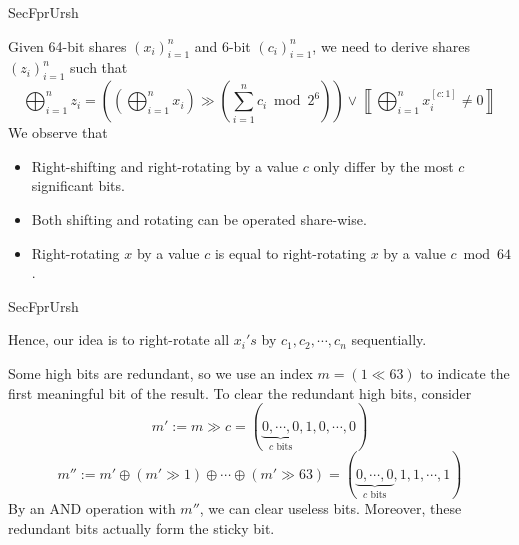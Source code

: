 \begin{frame}{SecFprUrsh}

Given 64-bit shares $(x_i)_{i=1}^n$ and 6-bit $(c_i)_{i=1}^n$, we need to derive shares $(z_i)_{i=1}^n$ such that
\[
\bigoplus_{i=1}^n z_i = \left( \left( \bigoplus_{i=1}^n x_i \right) \gg \left( \sum_{i=1}^n c_i \bmod 2^{6} \right) \right) \vee \left \llbracket \bigoplus_{i=1}^n x_i^{[c:1]} \neq 0 \right \rrbracket
\]
\pause
We observe that
\pause
\begin{itemize}

\item Right-shifting and right-rotating by a value $c$ only differ by the most $c$ significant bits.
\pause
\item Both shifting and rotating can be operated share-wise.
\pause
\item Right-rotating $x$ by a value $c$ is equal to right-rotating $x$ by a value $c \bmod 64$.
\end{itemize}

\end{frame}


\begin{frame}{SecFprUrsh}

Hence, our idea is to right-rotate all $x_i's$ by $c_1, c_2, \cdots, c_n$ sequentially.
\pause
\medskip

Some high bits are redundant, so we use an index $m = (1 \ll 63)$ to indicate the first meaningful bit of the result.
\pause
To clear the redundant high bits, consider
\[
m' := m \gg c = (\underbrace{0, \cdots, 0}_{c \text{ bits}}, 1, 0, \cdots, 0)
\]
\pause
\[
m'' := m' \oplus (m' \gg 1) \oplus \cdots \oplus (m' \gg 63) = (\underbrace{0, \cdots, 0}_{c \text{ bits}}, 1, 1, \cdots, 1)
\]
\pause
By an AND operation with $m''$, we can clear useless bits. Moreover, these redundant bits actually form the sticky bit.

\end{frame}


